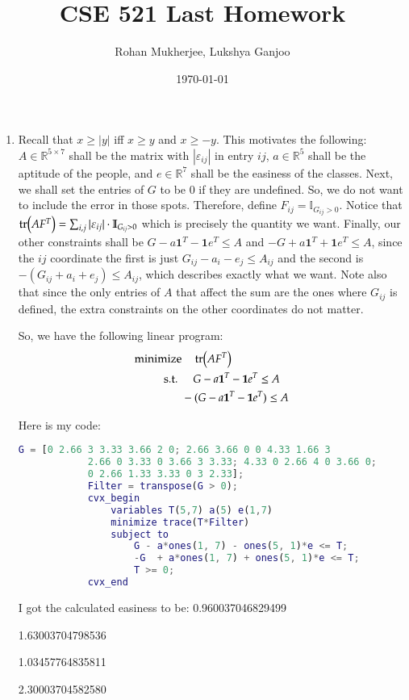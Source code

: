 \documentclass[12pt]{article}
\title{CSE 521 Last Homework}
\date{\today}
\author{Rohan Mukherjee, Lukshya Ganjoo}
\theoremstyle{definitionstyle}
\def\mbb#1{\mathbb{#1}}
\def \R{\mbb{R}}
\def \ve{\varepsilon}
\begin{document}
	\maketitle
	\begin{enumerate}[leftmargin=\labelsep]
		\item Recall that $x \geq |y|$ iff $x \geq y$ and $x \geq -y$. This motivates the following: $A \in \R^{5 \times 7}$ shall be the matrix with $|\ve_{ij}|$ in entry $ij$, $a \in \R^5$ shall be the aptitude of the people, and $e \in \R^7$ shall be the easiness of the classes. Next, we shall set the entries of $G$ to be 0 if they are undefined. So, we do not want to include the error in those spots. Therefore, define $F_{ij} = \mbb I_{G_{ij} > 0}$. Notice that $\tr(AF^T) = \sum_{i,j} |\ve_{ij}| \cdot \mbb I_{G_{ij} > 0}$ which is precisely the quantity we want. Finally, our other constraints shall be $G - a\mathbf 1^T - \mathbf 1e^T \leq A$ and $-G + a\mathbf 1^T + \mathbf 1e^T \leq A$, since the $ij$ coordinate the first is just $G_{ij} - a_i - e_j \leq A_{ij}$ and the second is $-(G_{ij} + a_i + e_j) \leq A_{ij}$, which describes exactly what we want. Note also that since the only entries of $A$ that affect the sum are the ones where $G_{ij}$ is defined, the extra constraints on the other coordinates do not matter.
		
		So, we have the following linear program:
		\begin{align*}
			\text{minimize}& \quad \tr(AF^T) \\
			\text{s.t. }& \quad  G - a\mathbf 1^T - \mathbf 1e^T \leq A \\
			&-(G - a\mathbf 1^T - \mathbf 1e^T) \leq A
		\end{align*}
	
		Here is my code:
		\begin{lstlisting}[language=matlab]
			G = [0 2.66 3 3.33 3.66 2 0; 2.66 3.66 0 0 4.33 1.66 3
			2.66 0 3.33 0 3.66 3 3.33; 4.33 0 2.66 4 0 3.66 0;
			0 2.66 1.33 3.33 0 3 2.33];
			Filter = transpose(G > 0);
			cvx_begin
				variables T(5,7) a(5) e(1,7)
				minimize trace(T*Filter)
				subject to
					G - a*ones(1, 7) - ones(5, 1)*e <= T;
					-G  + a*ones(1, 7) + ones(5, 1)*e <= T;
					T >= 0;
			cvx_end
		\end{lstlisting}
	
		I got the calculated easiness to be:
		0.960037046829499
		
		1.63003704798536
		
		1.03457764835811
		
		2.30003704582580
		

\end{enumerate}
\end{document}
